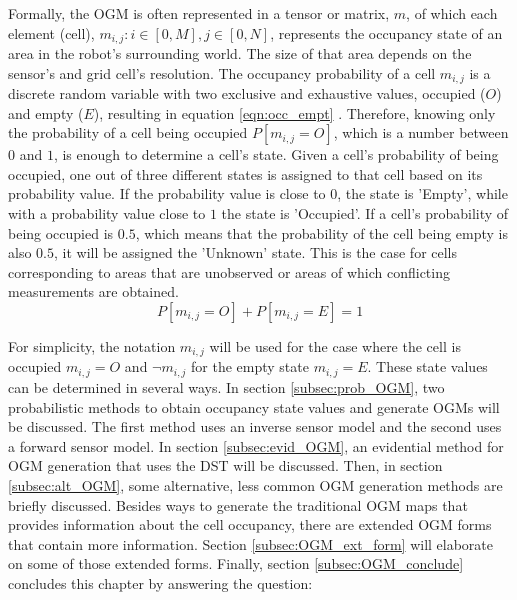 Formally, the \gls{OGM} is often represented in a tensor or matrix, $m$, of which each element (cell), $m_{i,j}: i \in [0, M],j \in [0, N]$, represents the occupancy state of an area in the robot's surrounding world. The size of that area depends on the sensor's and grid cell's resolution. The occupancy probability of a cell $m_{i,j}$ is a discrete random variable with two exclusive and exhaustive values, occupied ($O$) and empty ($E$), resulting in equation \ref{eqn:occ_empt} \cite{elfes1989using}. Therefore, knowing only the probability of a cell being occupied $P[m_{i,j} = O]$, which is a number between $0$ and $1$, is enough to determine a cell's state. Given a cell's probability of being occupied, one out of three different states is assigned to that cell based on its probability value. If the probability value is close to $0$, the state is 'Empty', while with a probability value close to $1$ the state is 'Occupied'. If a cell's probability of being occupied is $0.5$, which means that the probability of the cell being empty is also $0.5$, it will be assigned the 'Unknown' state. This is the case for cells corresponding to areas that are unobserved or areas of which conflicting measurements are obtained. \\

\begin{equation} \label{eqn:occ_empt}
	P[m_{i,j} = O] + P[m_{i,j} = E] = 1
\end{equation} 

\hfill \break

For simplicity, the notation $m_{i,j}$ will be used for the case where the cell is occupied $m_{i,j} = O$ and $\neg m_{i,j}$ for the empty state $m_{i,j} = E$.
These state values can be determined in several ways. In section \ref{subsec:prob_OGM}, two probabilistic methods to obtain occupancy state values and generate \glspl{OGM} will be discussed. The first method uses an inverse sensor model and the second uses a forward sensor model. In section \ref{subsec:evid_OGM}, an evidential method for \gls{OGM} generation that uses the \gls{DST} will be discussed. Then, in section \ref{subsec:alt_OGM}, some alternative, less common \gls{OGM} generation methods are briefly discussed.
Besides ways to generate the traditional \gls{OGM} maps that provides information about the cell occupancy, there are extended \gls{OGM} forms that contain more information. Section \ref{subsec:OGM_ext_form} will elaborate on some of those extended forms. Finally, section \ref{subsec:OGM_conclude} concludes this chapter by answering the question: 

